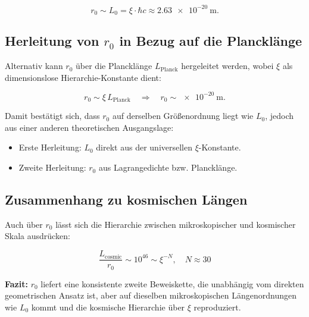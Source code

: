 \documentclass[12pt,a4paper]{article}
\begin{document}
	\begin{equation}
		r_0 \sim L_0 = \xi \cdot \hbar c \approx \SI{2.63e-20}{\meter}.
	\end{equation}
	
	\subsection{Herleitung von $r_0$ in Bezug auf die Plancklänge}
	
	Alternativ kann $r_0$ über die Plancklänge $L_{\mathrm{Planck}}$ hergeleitet werden, wobei $\xi$ als dimensionslose Hierarchie-Konstante dient:
	
	\begin{equation}
		r_0 \sim \xi \, L_{\mathrm{Planck}} \quad \Rightarrow \quad r_0 \sim \SI{e-20}{\meter}.
	\end{equation}
	
	Damit bestätigt sich, dass $r_0$ auf derselben Größenordnung liegt wie $L_0$, jedoch aus einer anderen theoretischen Ausgangslage:  
	
	\begin{itemize}
		\item Erste Herleitung: $L_0$ direkt aus der universellen $\xi$-Konstante.
		\item Zweite Herleitung: $r_0$ aus Lagrangedichte bzw. Plancklänge.
	\end{itemize}
	
	\subsection{Zusammenhang zu kosmischen Längen}
	
	Auch über $r_0$ lässt sich die Hierarchie zwischen mikroskopischer und kosmischer Skala ausdrücken:
	
	\begin{equation}
		\frac{L_{\mathrm{cosmic}}}{r_0} \sim 10^{46} \sim \xi^{-N}, \quad N \approx 30
	\end{equation}
	
	\textbf{Fazit:} $r_0$ liefert eine konsistente zweite Beweiskette, die unabhängig vom direkten geometrischen Ansatz ist, aber auf dieselben mikroskopischen Längenordnungen wie $L_0$ kommt und die kosmische Hierarchie über $\xi$ reproduziert.
	
\end{document}
